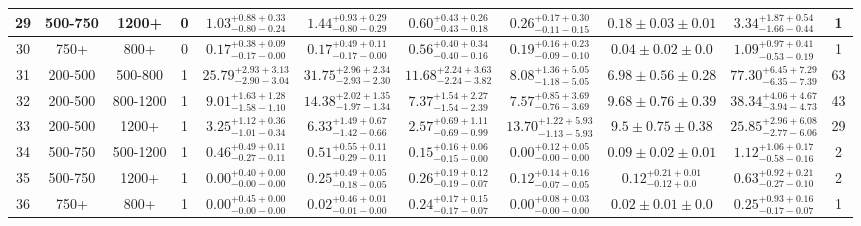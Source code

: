 \begin{table}
{\begin{tabular}{ |c|c|c|c||c|c|c|c|c||c|c| }
29 & 500-750 & 1200+ & 0 & $1.03^{+0.88+0.33}_{-0.80-0.24}$ & $1.44^{+0.93+0.29}_{-0.80-0.29}$ & $0.60^{+0.43+0.26}_{-0.43-0.18}$ & $0.26^{+0.17+0.30}_{-0.11-0.15}$ &$0.18\pm 0.03 \pm0.01$& $3.34^{+1.87+0.54}_{-1.66-0.44}$ & 1 \\ \hline
30 & 750+ & 800+ & 0 & $0.17^{+0.38+0.09}_{-0.17-0.00}$ & $0.17^{+0.49+0.11}_{-0.17-0.00}$ & $0.56^{+0.40+0.34}_{-0.40-0.16}$ & $0.19^{+0.16+0.23}_{-0.09-0.10}$ &$0.04\pm 0.02 \pm0.0$& $1.09^{+0.97+0.41}_{-0.53-0.19}$ & 1 \\ \hline
31 & 200-500 & 500-800 & 1 & $25.79^{+2.93+3.13}_{-2.90-3.04}$ & $31.75^{+2.96+2.34}_{-2.93-2.30}$ & $11.68^{+2.24+3.63}_{-2.24-3.82}$ & $8.08^{+1.36+5.05}_{-1.18-5.05}$ &$6.98\pm 0.56 \pm0.28$& $77.30^{+6.45+7.29}_{-6.35-7.39}$ & 63 \\ \hline
32 & 200-500 & 800-1200 & 1 & $9.01^{+1.63+1.28}_{-1.58-1.10}$ & $14.38^{+2.02+1.35}_{-1.97-1.34}$ & $7.37^{+1.54+2.27}_{-1.54-2.39}$ & $7.57^{+0.85+3.69}_{-0.76-3.69}$ &$9.68\pm 0.76 \pm0.39$& $38.34^{+4.06+4.67}_{-3.94-4.73}$ & 43 \\ \hline
33 & 200-500 & 1200+ & 1 & $3.25^{+1.12+0.36}_{-1.01-0.34}$ & $6.33^{+1.49+0.67}_{-1.42-0.66}$ & $2.57^{+0.69+1.11}_{-0.69-0.99}$ & $13.70^{+1.22+5.93}_{-1.13-5.93}$ &$9.5\pm 0.75 \pm0.38$& $25.85^{+2.96+6.08}_{-2.77-6.06}$ & 29 \\ \hline
34 & 500-750 & 500-1200 & 1 & $0.46^{+0.49+0.11}_{-0.27-0.11}$ & $0.51^{+0.55+0.11}_{-0.29-0.11}$ & $0.15^{+0.16+0.06}_{-0.15-0.00}$ & $0.00^{+0.12+0.05}_{-0.00-0.00}$ &$0.09\pm 0.02 \pm0.01$& $1.12^{+1.06+0.17}_{-0.58-0.16}$ & 2 \\ \hline
35 & 500-750 & 1200+ & 1 & $0.00^{+0.40+0.00}_{-0.00-0.00}$ & $0.25^{+0.49+0.05}_{-0.18-0.05}$ & $0.26^{+0.19+0.12}_{-0.19-0.07}$ & $0.12^{+0.14+0.16}_{-0.07-0.05}$ &$0.12^{+0.21+0.01}_{-0.12+0.0}$& $0.63^{+0.92+0.21}_{-0.27-0.10}$ & 2 \\ \hline
36 & 750+ & 800+ & 1 & $0.00^{+0.45+0.00}_{-0.00-0.00}$ & $0.02^{+0.46+0.01}_{-0.01-0.00}$ & $0.24^{+0.17+0.15}_{-0.17-0.07}$ & $0.00^{+0.08+0.03}_{-0.00-0.00}$ &$0.02\pm 0.01 \pm0.0$& $0.25^{+0.93+0.16}_{-0.17-0.07}$ & 1 \\ \hline
\end{tabular}
}
\end{table}
